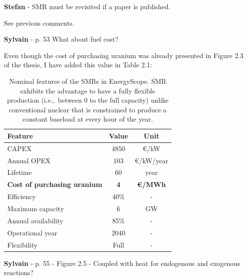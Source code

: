 \documentclass[12pt,a4paper]{article}
\def\ie{i.e.,\ }
\begin{document}
\begin{mdframed}[style=comment] %
{\color{teal} \textbf{Stefan}} - SMR must be revisited if a paper is published.
\end{mdframed}

\noindent See previous comments.

\begin{mdframed}[style=comment] %
{\color{purple} \textbf{Sylvain}} - p. 53 What about fuel cost?
\end{mdframed}

\noindent Even though the cost of purchasing uranium was already presented in Figure 2.3 of the thesis, I have added this value {\color{blue}in Table 2.1}:

\begin{table}[htbp!]
\caption{Nominal features of the SMRs in EnergyScope. SMR exhibits the advantage to have a fully flexible production (\ie between 0 to the full capacity) unlike conventional nuclear that is constrained to produce a constant baseload at every hour of the year.}
\label{tab:SMR_features}
\begin{minipage}{\linewidth}
\centering
\begin{tabular}{l c c}
\hline
\textbf{Feature} & \textbf{Value} & \textbf{Unit}\\
\hline
CAPEX & 4850 & €/kW \\
Annual OPEX & 103 & €/kW/year \\
Lifetime & 60 & year \\
\textbf{Cost of purchasing uranium} & \textbf{4} & \textbf{€/MWh}\\
Efficiency & 40\% & -\\
Maximum capacity & 6 & GW \\
Annual availability & 85\% & -\\
Operational year & 2040 & - \\
Flexibility & Full & - \\
\hline						

\end{tabular}
\end{minipage}
\end{table}

\begin{mdframed}[style=comment] %
{\color{purple} \textbf{Sylvain}} - p. 55 - Figure 2.5 - Coupled with heat for endogenous and exogenous reactions?
\end{mdframed}
\end{document}
